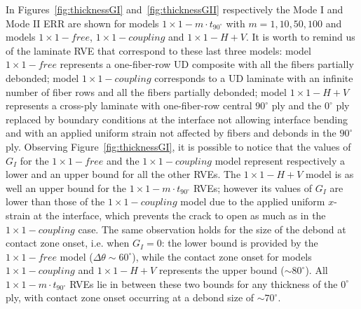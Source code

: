 \documentclass[review]{elsarticle}
\begin{document}
In Figures~\ref{fig:thicknessGI} and~\ref{fig:thicknessGII} respectively the Mode I and Mode II ERR are shown for models $1\times 1-m\cdot t_{90^{\circ}}$ with $m=1,10,50,100$ and models $1\times 1-free$, $1\times 1-coupling$ and $1\times 1-H+V$. It is worth to remind us of the laminate RVE that correspond to these last three models: model $1\times 1-free$ represents a one-fiber-row UD composite with all the fibers partially debonded; model $1\times 1-coupling$ corresponds to a UD laminate with an infinite number of fiber rows and all the fibers partially debonded; model $1\times 1-H+V$ represents a cross-ply laminate with one-fiber-row central $90^{\circ}$ ply and the $0^{\circ}$ ply replaced by boundary conditions at the interface not allowing interface bending and with an applied uniform strain not affected by fibers and debonds in the $90^{\circ}$ ply. Observing Figure~\ref{fig:thicknessGI}, it is possible to notice that the values of $G_{I}$ for the $1\times 1-free$ and the $1\times 1-coupling$ model represent respectively a lower and an upper bound for all the other RVEs. The $1\times 1-H+V$ model is as well an upper bound for the $1\times 1-m\cdot t_{90^{\circ}}$ RVEs; however its values of $G_{I}$ are lower than those of the $1\times 1-coupling$ model due to the applied uniform $x$-strain at the interface, which prevents the crack to open as much as in the $1\times 1-coupling$ case. The same observation holds for the size of the debond at contact zone onset, i.e. when $G_{I}=0$: the lower bound is provided by the $1\times 1-free$ model ($\Delta\theta\sim60^{\circ}$), while the contact zone onset for models $1\times 1-coupling$ and $1\times 1-H+V$ represents the upper bound ($\sim80^{\circ}$). All $1\times 1-m\cdot t_{90^{\circ}}$ RVEs lie in between these two bounds for any thickness of the $0^{\circ}$ ply, with contact zone onset occurring at a debond size of $\sim70^{\circ}$.

\end{document}
